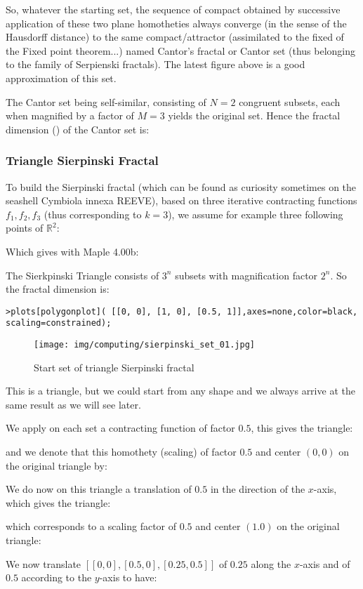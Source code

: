 	So, whatever the starting set, the sequence of compact obtained by successive application of these two plane homotheties always converge (in the sense of the Hausdorff distance) to the same compact/attractor (assimilated to the fixed of the Fixed point theorem...) named Cantor's fractal or Cantor set (thus belonging to the family of Serpienski fractals). The latest figure above is a good approximation of this set.
	
	The Cantor set being self-similar, consisting
of $N=2$ congruent subsets, each when magnified by a factor of $M = 3$ yields the original set. Hence the fractal dimension () of the Cantor set is:
	
	
	\subsubsection{Triangle Sierpinski Fractal}
	To build the Sierpinski fractal (which can be found as curiosity sometimes on the seashell Cymbiola innexa REEVE), based on three iterative contracting functions $f_1,f_2,f_3$ (thus corresponding to $k = 3$), we assume for example three following points of $\mathbb{R}^2$:
	
	Which gives with Maple 4.00b:
	
	The Sierkpinski Triangle consists of $3^n$ subsets with magnification factor $2^n$. So the fractal dimension is:
	
	
	\texttt{>plots[polygonplot]( [[0, 0], [1, 0], [0.5, 1]],axes=none,color=black, scaling=constrained);}
	\begin{figure}[H]
		\centering
		\texttt{[image: img/computing/sierpinski\_set\_01.jpg]}
		\caption[]{Start set of triangle Sierpinski fractal}
	\end{figure}
	This is a triangle, but we could start from any shape and we always arrive at the same result as we will see later.
	
	We apply on each set a contracting function of factor $0.5$, this gives the triangle:
	
	and we denote that this homothety (scaling) of factor $0.5$ and center $(0,0)$ on the original triangle by:
	
	We do now on this triangle a translation of $0.5$ in the direction of the $x$-axis, which gives the triangle:
	
	which corresponds to a scaling factor of $0.5$ and center $(1.0)$ on the original triangle:
	
	We now translate $[[0,0], [0.5,0], [0.25,0.5]]$ of $0.25$ along the $x$-axis and of $0.5$ according to the $y$-axis to have:
	
